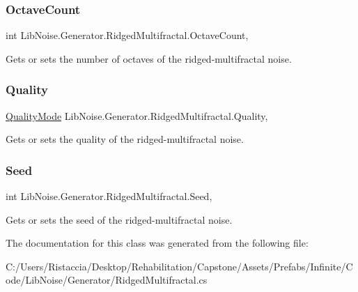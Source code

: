 \subsubsection{\texorpdfstring{Octave\+Count}{OctaveCount}}
{\footnotesize\ttfamily int Lib\+Noise.\+Generator.\+Ridged\+Multifractal.\+Octave\+Count\hspace{0.3cm}{\ttfamily [get]}, {\ttfamily [set]}}



Gets or sets the number of octaves of the ridged-\/multifractal noise. 

\mbox{\label{class_lib_noise_1_1_generator_1_1_ridged_multifractal_aa09e67f1126b8dfbb6872ecb4dac0249}} 
\subsubsection{\texorpdfstring{Quality}{Quality}}
{\footnotesize\ttfamily \hyperlink{namespace_lib_noise_ab253d2180e71b8b4b51e250163ca0e27}{Quality\+Mode} Lib\+Noise.\+Generator.\+Ridged\+Multifractal.\+Quality\hspace{0.3cm}{\ttfamily [get]}, {\ttfamily [set]}}



Gets or sets the quality of the ridged-\/multifractal noise. 

\mbox{\label{class_lib_noise_1_1_generator_1_1_ridged_multifractal_ad32f33d7fb1da8310c5ab148bb78f20e}} 
\subsubsection{\texorpdfstring{Seed}{Seed}}
{\footnotesize\ttfamily int Lib\+Noise.\+Generator.\+Ridged\+Multifractal.\+Seed\hspace{0.3cm}{\ttfamily [get]}, {\ttfamily [set]}}



Gets or sets the seed of the ridged-\/multifractal noise. 



The documentation for this class was generated from the following file\+:\begin{DoxyCompactItemize}
\item 
C\+:/\+Users/\+Ristaccia/\+Desktop/\+Rehabilitation/\+Capstone/\+Assets/\+Prefabs/\+Infinite/\+Code/\+Lib\+Noise/\+Generator/Ridged\+Multifractal.\+cs\end{DoxyCompactItemize}
